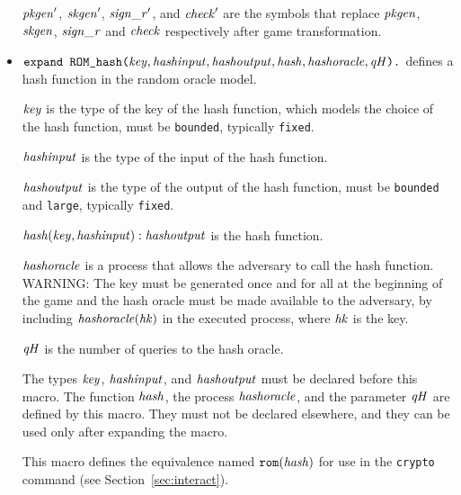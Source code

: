 \documentclass{article}
\begin{document}
\begin{itemize}
  $\mathit{pkgen}'$, $\mathit{skgen}'$, $\mathit{sign\_r}'$, and $\mathit{check}'$ are the symbols that replace $\mathit{pkgen}$, $\mathit{skgen}$, $\mathit{sign\_r}$ and $\mathit{check}$ respectively after game transformation.

\item $\texttt{expand ROM\_hash(}\mathit{key}, \mathit{hashinput}, \mathit{hashoutput}, \mathit{hash}, \mathit{hashoracle}, \mathit{qH}\texttt{).}$
defines a hash function in the random oracle model.

$\mathit{key}$ is the type of the key of the hash function, which models
the choice of the hash function, must be \texttt{bounded}, typically 
\texttt{fixed}.

   $\mathit{hashinput}$ is the type of the input of the hash function.

   $\mathit{hashoutput}$ is the type of the output of the hash function, must be \texttt{bounded} and \texttt{large}, typically \texttt{fixed}.

   $\mathit{hash}(\mathit{key}, \mathit{hashinput}): \mathit{hashoutput}$ is the hash function.

    $\mathit{hashoracle}$ is a process that allows the adversary to call the hash function.
    WARNING: The key must be generated once and for all at the beginning of the game 
   and the hash oracle must be made available to the adversary,
    by including $\mathit{hashoracle}(\mathit{hk})$ in the executed process,
    where $\mathit{hk}$ is the key.

    $\mathit{qH}$ is the number of queries to the hash oracle.

    The types $\mathit{key}$, $\mathit{hashinput}$, and $\mathit{hashoutput}$ must
    be declared before this macro.  The function $\mathit{hash}$, the
    process $\mathit{hashoracle}$, and the parameter $\mathit{qH}$ are defined
    by this macro. They must not be declared elsewhere, and they can
    be used only after expanding the macro.

   This macro defines the equivalence named $\texttt{rom}(\mathit{hash})$
   for use in the \texttt{crypto} command 
   (see Section~\ref{sec:interact}).


\end{itemize}
\end{document}
